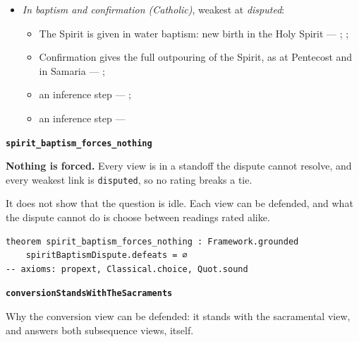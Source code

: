 \documentclass[11pt]{article}
\begin{document}
\begin{itemize}
\begin{itemize}
\item an inference step --- \cite[to Joseph Benson, 28 December 1770]{wesley-letters-1931}; \cite{bassett-white-paper-article-x-2010}
\end{itemize}
\item \emph{In baptism and confirmation (Catholic)}, weakest at \emph{disputed}:
\begin{itemize}
\item The Spirit is given in water baptism: new birth in the Holy Spirit --- \cite[1262]{catholic-church-catechism-2000}; \cite[1265]{catholic-church-catechism-2000}; \cite[Small Catechism, Baptism, third part]{kolb-wengert-book-of-concord-2000}
\item Confirmation gives the full outpouring of the Spirit, as at Pentecost and in Samaria --- \cite[1302]{catholic-church-catechism-2000}; \cite[1288]{catholic-church-catechism-2000}
\item an inference step --- \cite[1302]{catholic-church-catechism-2000}; \cite[XXVIII.6]{westminster-confession-1647}
\item an inference step --- \cite[1302]{catholic-church-catechism-2000}
\end{itemize}
\end{itemize}
\par\medskip\noindent\textbf{\texttt{spirit\_\allowbreak{}baptism\_\allowbreak{}forces\_\allowbreak{}nothing}}\par\nobreak\noindent
\textbf{Nothing is forced.} Every view is in a standoff the dispute cannot resolve, and every weakest link is \texttt{disputed}, so no rating breaks a tie.

It does not show that the question is idle. Each view can be defended, and what the dispute cannot do is choose between readings rated alike.

{\small\begin{verbatim}
theorem spirit_baptism_forces_nothing : Framework.grounded
    spiritBaptismDispute.defeats = ∅
-- axioms: propext, Classical.choice, Quot.sound
\end{verbatim}}
\par\medskip\noindent\textbf{\texttt{conversion\allowbreak{}Stands\allowbreak{}With\allowbreak{}The\allowbreak{}Sacraments}}\par\nobreak\noindent
Why the conversion view can be defended: it stands with the sacramental view, and answers both subsequence views, itself.
\end{document}
